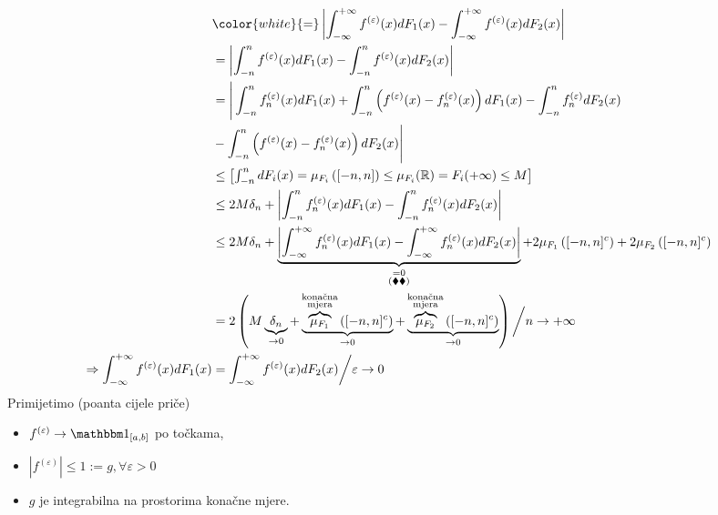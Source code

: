 \documentclass{article}
\begin{document}
\[\begin{aligned}&{\color{white}{=}}\left|\int_{-\infty}^{+\infty}f^{(\varepsilon)}(x)dF_1(x)-\int_{-\infty}^{+\infty}f^{(\varepsilon)}(x)dF_2(x)\right|\\&=\left|\int_{-n}^nf^{(\varepsilon)}(x)dF_1(x)-\int_{-n}^nf^{(\varepsilon)}(x)dF_2(x)\right|\\&=\Bigg|\int_{-n}^nf_n^{(\varepsilon)}(x)dF_1(x)+\int_{-n}^n\left(f^{(\varepsilon)}(x)-f_n^{(\varepsilon)}(x)\right)dF_1(x)-\int_{-n}^nf_n^{(\varepsilon)}dF_2(x)\\&-\int_{-n}^n\left(f^{(\varepsilon)}(x)-f_n^{(\varepsilon)}(x)\right)dF_2(x)\Bigg|\\&\le{\begin{bmatrix}\int_{-n}^ndF_i(x)=\mu_{F_i}\left([-n,n]\right)\le\mu_{F_i}(\Bbb R)=F_i(+\infty)\le M\end{bmatrix}}\\&\le 2M\delta_n+\left|\int_{-n}^nf_n^{(\varepsilon)}(x)dF_1(x)-\int_{-n}^nf_n^{(\varepsilon)}(x)dF_2(x)\right|\\&\le2M\delta_n+\underbrace{\left|\int_{-\infty}^{+\infty}f_n^{(\varepsilon)}(x)dF_1(x)-\int_{-\infty}^{+\infty}f_n^{(\varepsilon)}(x)dF_2(x)\right|}_{\substack{=0\\(\blacklozenge\blacklozenge)}}+2\mu_{F_1}\left([-n,n]^c\right)+2\mu_{F_2}\left([-n,n]^c\right)\\&=2\left(M\underbrace{\delta_n}_{\to 0}+\underbrace{\overbrace{\mu_{F_1}}^{\substack{\text{konačna}\\\text{mjera}}}\left([-n,n]^c\right)}_{\to 0}+\underbrace{\overbrace{\mu_{F_2}}^{\substack{\text{konačna}\\\text{mjera}}}\left([-n,n]^c\right)}_{\to 0}\right)\bigg/n\to+\infty\\\Rightarrow\int_{-\infty}^{+\infty}f^{(\varepsilon)}(x)dF_1(x)&=\int_{-\infty}^{+\infty}f^{(\varepsilon)}(x)dF_2(x)\bigg/\varepsilon\to 0\end{aligned}\] Primijetimo (poanta cijele priče)
\begin{itemize}
    \item[\ding{113}] \(f^{(\varepsilon)}\to\mathbbm 1_{[a,b]}\) po točkama,
    \item[\ding{113}] \(\left|f^{(\varepsilon)}\right|\le 1:=g,\forall \varepsilon>0\)
    \item[\ding{113}] \(g\) je integrabilna na prostorima konačne mjere.
\end{itemize} 
\end{document}
